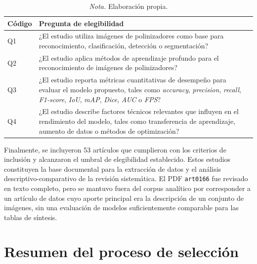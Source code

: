 \begin{table}[H]
    \centering
    \caption{Preguntas de elegibilidad}
    \small
    \label{tab:preguntas-elegibilidad}
    \begin{tabular}{p{1.8cm} p{11.5cm}}
        \hline
        \textbf{Código} & \textbf{Pregunta de elegibilidad} \\
        \hline
        
        Q1 & ¿El estudio utiliza imágenes de polinizadores como base para reconocimiento, clasificación, detección o segmentación? \\
        
        Q2 & ¿El estudio aplica métodos de aprendizaje profundo para el reconocimiento de imágenes de polinizadores? \\
        
        Q3 & ¿El estudio reporta métricas cuantitativas de desempeño para evaluar el modelo propuesto, tales como \textit{accuracy}, \textit{precision}, \textit{recall}, \textit{F1-score}, \textit{IoU}, \textit{mAP}, \textit{Dice}, \textit{AUC} o \textit{FPS}? \\
        
        Q4 & ¿El estudio describe factores técnicos relevantes que influyen en el rendimiento del modelo, tales como transferencia de aprendizaje, aumento de datos o métodos de optimización? \\
        
        \hline
    \end{tabular}

    \caption*{\normalfont\normalsize\textit{Nota.} Elaboración propia.}
\end{table}

\vspace{-1.0 cm}
Finalmente, se incluyeron 53 artículos que cumplieron con los criterios de inclusión y alcanzaron el umbral de elegibilidad establecido. Estos estudios constituyen la base documental para la extracción de datos y el análisis descriptivo-comparativo de la revisión sistemática. El PDF \texttt{art0166} fue revisado en texto completo, pero se mantuvo fuera del corpus analítico por corresponder a un artículo de datos cuyo aporte principal era la descripción de un conjunto de imágenes, sin una evaluación de modelos suficientemente comparable para las tablas de síntesis.

\section{Resumen del proceso de selección}

